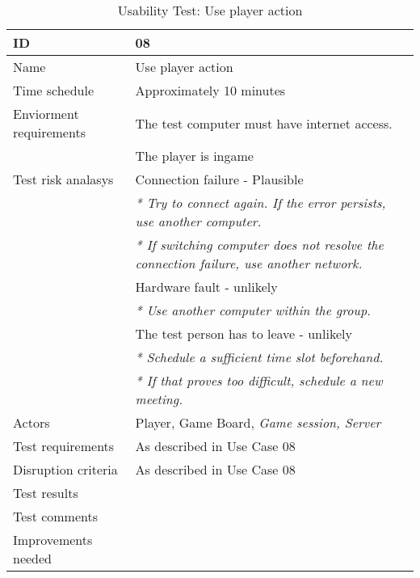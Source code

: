 {\footnotesize
\begin{table}[H]
\begin{tabular}{| p{5cm} | p{10cm} |}\hline
	\textbf{ID}	& \textbf{08} \\ \hline
	Name		& Use player action\\ \hline
	Time schedule	& Approximately 10 minutes\\ \hline
	Enviorment requirements 
		& The test computer must have internet access. \\ 
		& The player is ingame\\ \hline
	Test risk analasys 
		& Connection failure - Plausible \\
		& \emph{* Try to connect again. If the error persists, use another computer.} \\
		& \emph{* If switching computer does not resolve the connection failure, use another network.}\\
		& Hardware fault - unlikely \\
		& \emph{* Use another computer within the group.} \\
		& The test person has to leave - unlikely \\
		& \emph{* Schedule a sufficient time slot beforehand.} \\
		& \emph{* If that proves too difficult, schedule a new meeting.}\\ \hline
	Actors	& Player, Game Board, \emph{Game session, Server}\\ \hline
	Test requirements & As described in Use Case 08 \\ \hline
	Disruption criteria & As described in Use Case 08  \\ \hline
	Test results 
		& \\ \hline
	Test comments
		& \\ \hline
	Improvements needed
		& \\ \hline
\end{tabular}


\caption{Usability Test: Use player action}
\label{fig:usability_test_8}
\end{table}}






